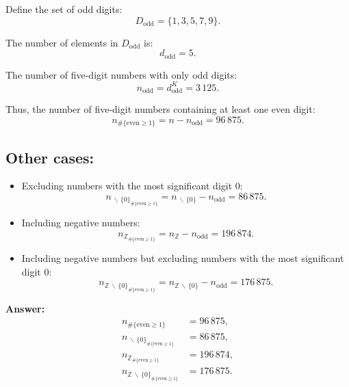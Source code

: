 \documentclass[12pt]{article}
\begin{document}
Define the set of odd digits:
\[
D_{\text{odd}} = \{1,3,5,7,9\}.
\]

The number of elements in \( D_{\text{odd}} \) is:
\[
d_{\text{odd}} = 5.
\]

The number of five-digit numbers with only odd digits:
\[
n_{\text{odd}} = d_{\text{odd}}^K = 3\,125.
\]

Thus, the number of five-digit numbers containing at least one even digit:
\[
n_{\#\{\text{even} \geq 1\}} = n - n_{\text{odd}} = 96\,875.
\]

\subsection*{Other cases:}

\begin{itemize}
    \item Excluding numbers with the most significant digit 0:
    \[
    n_{\,\backslash\,\{0\}_{\#\{\text{even} \geq 1\}}} = n_{\,\backslash\,\{0\}} - n_{\text{odd}} = 86\,875.
    \]
    
    \item Including negative numbers:
    \[
    n_{\mathbb{Z}_{\#\{\text{even} \geq 1\}}} = n_{\mathbb{Z}} - n_{\text{odd}} = 196\,874.
    \]
    
    \item Including negative numbers but excluding numbers with the most significant digit 0:
    \[
    n_{\mathbb{Z}\,\backslash\,\{0\}_{\#\{\text{even} \geq 1\}}} = n_{\mathbb{Z}\,\backslash\,\{0\}} - n_{\text{odd}} = 176\,875.
    \]
\end{itemize}

\textbf{Answer:}
\[
\begin{aligned}
n_{\#\{\text{even} \geq 1\}} &= 96\,875, \\
n_{\,\backslash\,\{0\}_{\#\{\text{even} \geq 1\}}} &= 86\,875, \\
n_{\mathbb{Z}_{\#\{\text{even} \geq 1\}}} &= 196\,874, \\
n_{\mathbb{Z}\,\backslash\,\{0\}_{\#\{\text{even} \geq 1\}}} &= 176\,875.
\end{aligned}
\]
\end{document}
